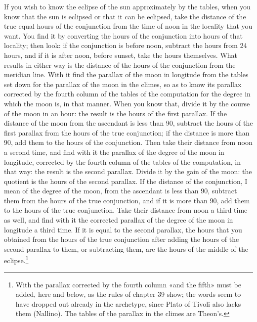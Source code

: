 \documentclass[11pt]{article}
\newcommand{\ArPage}[1]{\marginpar{\footnotesize\color{gray}Ar.\,p.\,#1}}
\begin{document}
\par \ArPage{167}If you wish to know the eclipse of the sun approximately by the tables, when you know that the sun is eclipsed or that it can be eclipsed, take the distance of the true equal hours of the conjunction from the time of noon in the locality that you want. You find it by converting the hours of the conjunction into hours of that locality; then look: if the conjunction is before noon, subtract the hours from 24 hours, and if it is after noon, before sunset, take the hours themselves. What results in either way is the distance of the hours of the conjunction from the meridian line. With it find the parallax of the moon in longitude from the tables set down for the parallax of the moon in the climes, so as to know its parallax corrected by the fourth column of the tables of the computation for the degree in which the moon is, in that manner. When you know that, divide it by the course of the moon in an hour: the result is the hours of the first parallax. If the distance of the moon from the ascendant is less than 90, subtract the hours of the first parallax from the hours of the true conjunction; if the distance is more than 90, add them to the hours of the conjunction. Then take their distance from noon a second time, and find with it the parallax of the degree of the moon in longitude, corrected by the fourth column of the tables of the computation, in that way: the result is the second parallax. Divide it by the gain of the moon: the quotient is the hours of the second parallax. If the distance of the conjunction, I mean of the degree of the moon, from the ascendant is less than 90, subtract them from the hours of the true conjunction, and if it is more than 90, add them to the hours of the true conjunction. Take their distance from noon a third time as well, and find with it the corrected parallax of the degree of the moon in longitude a third time. If it is equal to the second parallax, the hours that you obtained from the hours of the true conjunction after adding the hours of the second parallax to them, or subtracting them, are the hours of the middle of the eclipse.\footnote{With the parallax corrected by the fourth column «and the fifth» must be added, here and below, as the rules of chapter 39 show; the words seem to have dropped out already in the archetype, since Plato of Tivoli also lacks them (Nallino). The tables of the parallax in the climes are Theon's.}\par
\end{document}
